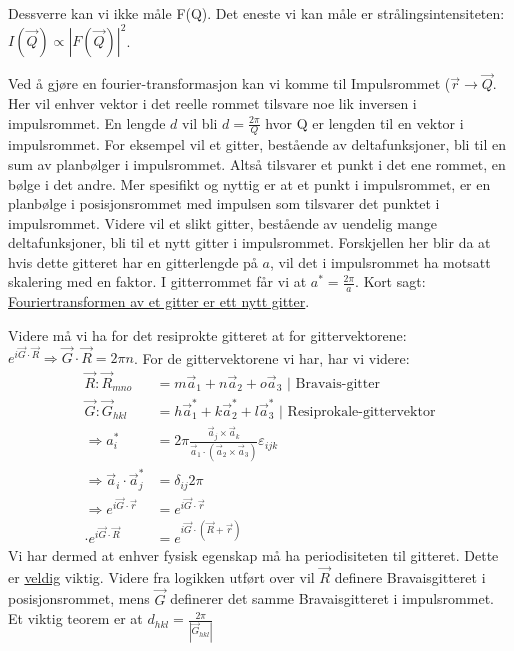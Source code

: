 \documentclass{article}
\begin{document}
Dessverre kan vi ikke måle F(Q). Det eneste vi kan måle er strålingsintensiteten: $I(\vec{Q}) \propto |F(\vec{Q})|^2$.

Ved å gjøre en fourier-transformasjon kan vi komme til Impulsrommet ($\vec{r} \rightarrow \vec{Q}$. Her vil enhver vektor i det reelle rommet tilsvare noe lik inversen i impulsrommet. En lengde $d$ vil bli $d = \frac{2 \pi}{Q}$ hvor Q er lengden til en vektor i impulsrommet. For eksempel vil et gitter, bestående av deltafunksjoner, bli til en sum av planbølger i impulsrommet. Altså tilsvarer et punkt i det ene rommet, en bølge i det andre. Mer spesifikt og nyttig er at et punkt i impulsrommet, er en planbølge i posisjonsrommet med impulsen som tilsvarer det punktet i impulsrommet. Videre vil et slikt gitter, bestående av uendelig mange deltafunksjoner, bli til et nytt gitter i impulsrommet. Forskjellen her blir da at hvis dette gitteret har en gitterlengde på $a$, vil det i impulsrommet ha motsatt skalering med en faktor. I gitterrommet får vi at $a^{*} = \frac{2\pi}{a}$. Kort sagt:
\underline{Fouriertransformen av et gitter er ett nytt gitter}.

Videre må vi ha for det resiprokte gitteret at for gittervektorene: $e^{i \vec{G} \cdot \vec{R}} \Rightarrow \vec{G} \cdot \vec{R} = 2 \pi n$. For de gittervektorene vi har, har vi videre:
\begin{align}
    \vec{R}: \vec{R}_{mno} &= m \vec{a}_1 + n\vec{a}_2 + o \vec{a}_3 \text{  | Bravais-gitter} \\
\vec{G}: \vec{G}_{hkl} &= h \vec{a}^{*}_1 + k\vec{a}^{*}_2 + l\vec{a}^{*}_3 \text{  | Resiprokale-gittervektor} \\
\Rightarrow a_i^{*} &= 2 \pi \frac{\vec{a}_j \times \vec{a}_k}{\vec{a}_1 \cdot (\vec{a}_2 \times \vec{a}_3)} \varepsilon_{ijk} \\
\Rightarrow \vec{a}_i \cdot \vec{a}^{*}_{j} &= \delta_{ij} 2 \pi \\
\Rightarrow e^{i \vec{G} \cdot \vec{r}} &= e^{i \vec{G} \cdot \vec{r}} \\\cdot e^{i \vec{G} \cdot \vec{R}} &= e^{i \vec{G} \cdot(\vec{R} + \vec{r})}
\end{align}
Vi har dermed at enhver fysisk egenskap må ha periodisiteten til gitteret. Dette er \underline{veldig} viktig. Videre fra logikken utført over vil $\vec{R}$ definere Bravaisgitteret i posisjonsrommet, mens $\vec{G}$ definerer det samme Bravaisgitteret i impulsrommet. Et viktig teorem er at $d_{hkl} = \frac{2\pi}{|\vec{G}_{hkl}|}$
\end{document}
